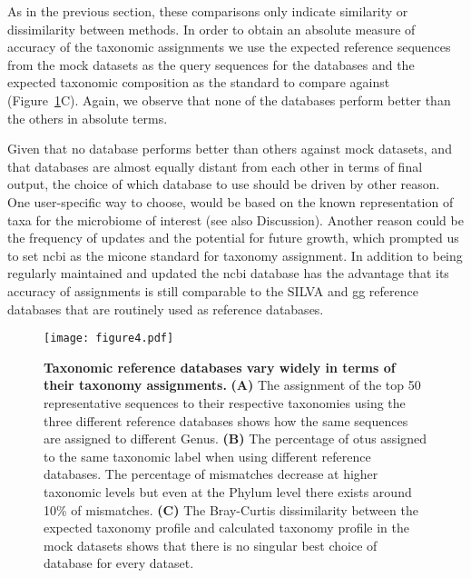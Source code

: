   As in the previous section, these comparisons only indicate similarity or dissimilarity between methods.
  In order to obtain an absolute measure of accuracy of the taxonomic assignments we use the expected reference sequences from the mock datasets as the query sequences for the databases and the expected taxonomic composition as the standard to compare against (Figure~\ref{fig:figure4}C).
  Again, we observe that none of the databases perform better than the others in absolute terms.

  Given that no database performs better than others against mock datasets, and that databases are almost equally distant from each other in terms of final output, the choice of which database to use should be driven by other reason.
  One user-specific way to choose, would be based on the known representation of taxa for the microbiome of interest (see also Discussion). Another reason could be the frequency of updates and the potential for future growth, which prompted us to set \ac{ncbi} as the \ac{micone} standard for taxonomy assignment.
 In addition to being regularly maintained and updated the \ac{ncbi} database has the advantage that its accuracy of assignments is still comparable to the SILVA and \ac{gg} reference databases that are routinely used as reference databases.

  \begin{figure}[H]
    \centering
    \texttt{[image: figure4.pdf]}
  \end{figure}
  \begin{figure}[!t]
    \centering
    \caption{
      \textbf{Taxonomic reference databases vary widely in terms of their taxonomy assignments.}
      \textbf{(A)} The assignment of the top 50 representative sequences to their respective taxonomies using the three different reference databases shows how the same sequences are assigned to different Genus.
      \textbf{(B)} The percentage of \ac{otu}s assigned to the same taxonomic label when using different reference databases.
      The percentage of mismatches decrease at higher taxonomic levels but even at the Phylum level there exists around 10\% of mismatches.
      \textbf{(C)} The Bray-Curtis dissimilarity between the expected taxonomy profile and calculated taxonomy profile in the mock datasets shows that there is no singular best choice of database for every dataset.
    }
    \label{fig:figure4}
  \end{figure}

    

